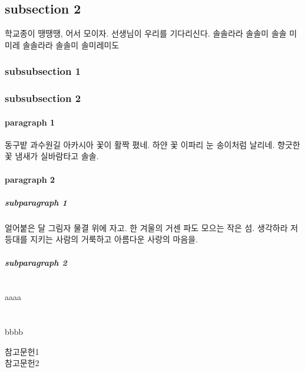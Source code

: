 \documentclass[a4paper, 11pt]{book}
\begin{document}
\subsection{subsection 2}
학교종이 땡땡땡, 어서 모이자. 선생님이 우리를 기다리신다. 솔솔라라 솔솔미 솔솔 미미레 솔솔라라 솔솔미 솔미레미도
\subsubsection{subsubsection 1}
\subsubsection{subsubsection 2}
\paragraph{paragraph 1}
동구밭 과수원길 아카시아 꽃이 활짝 폈네. 하얀 꽃 이파리 눈 송이처럼 날리네. 향긋한 꽃 냄새가 실바람타고 솔솔.
\paragraph{paragraph 2}
\subparagraph{subparagraph 1}
얼어붙은 달 그림자 물결 위에 자고. 한 겨울의 거센 파도 모으는 작은 섬. 생각하라 저 등대를 지키는 사람의 거룩하고 아름다운 사랑의 마음을.
\subparagraph{subparagraph 2}



\appendix
\section{}
aaaa
\section{}
bbbb

\backmatter{}
참고문헌1\\
참고문헌2\\
\end{document}
